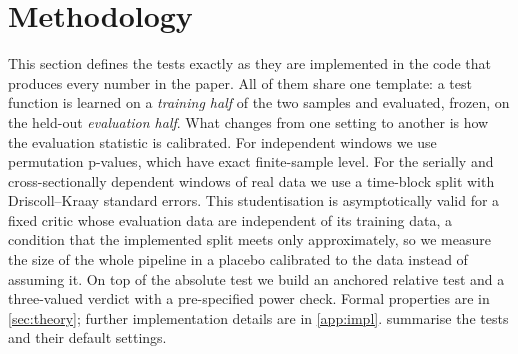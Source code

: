\section{Methodology}\label{sec:method}

This section defines the tests exactly as they are implemented in the code that produces every
number in the paper. All of them share one template: a test function is learned on a
\emph{training half} of the two samples and evaluated, frozen, on the held-out
\emph{evaluation half}. What changes from one setting to another is how the evaluation
statistic is calibrated. For independent windows we use permutation p-values, which have exact
finite-sample level. For the serially and cross-sectionally dependent windows of real data we
use a time-block split with Driscoll--Kraay standard errors. This studentisation is
asymptotically valid for a fixed critic whose evaluation data are independent of its training
data, a condition that the implemented split meets only approximately, so we measure the size of
the whole pipeline in a placebo calibrated to the data instead of assuming it. On
top of the absolute test we build an anchored relative test and a three-valued verdict with a
pre-specified power check. Formal properties are in \cref{sec:theory}; further implementation
details are in \cref{app:impl}.  summarise the tests
and their default settings.

